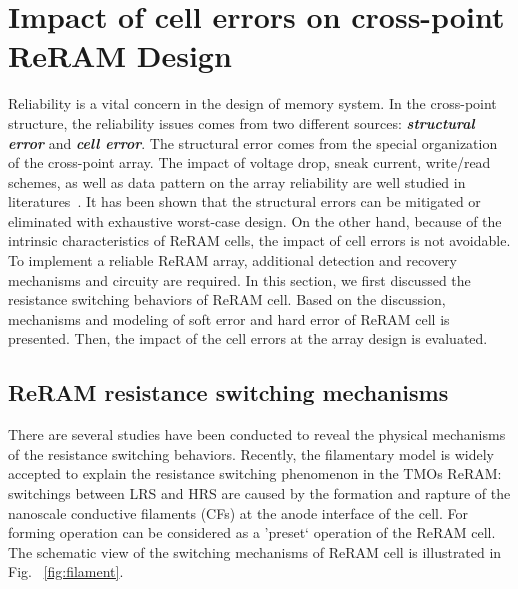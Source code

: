 \section{Impact of cell errors on cross-point ReRAM Design}

Reliability is a vital concern in the design of memory system. In the cross-point structure, the reliability issues comes from two different sources: \emph{\textbf{structural error}} and \emph{\textbf{cell error}}. The structural error comes from the special organization of the cross-point array. The impact of voltage drop, sneak current, write/read schemes, as well as data pattern on the array reliability are well studied in literatures~\cite{jiale,Dimin_ISLPED}. It has been shown that the structural errors can be mitigated or eliminated with exhaustive worst-case design. On the other hand, because of the intrinsic characteristics of ReRAM cells, the impact of cell errors is not avoidable. To implement a reliable ReRAM array, additional detection and recovery mechanisms and circuity are required. In this section, we first discussed the resistance switching behaviors of ReRAM cell. Based on the discussion, mechanisms and modeling of soft error and hard error of ReRAM cell is presented. Then, the impact of the cell errors at the array design is evaluated.

\subsection{ReRAM resistance switching mechanisms}
There are several studies have been conducted to reveal the physical mechanisms of the resistance switching behaviors. Recently, the filamentary model is widely accepted to explain the resistance switching phenomenon in the TMOs ReRAM: switchings between LRS and HRS are caused by the formation and rapture of the nanoscale conductive filaments (CFs) at the anode interface of the cell. For forming operation can be considered as a 'preset` operation of the ReRAM cell. The schematic view of the switching mechanisms of ReRAM cell is illustrated in Fig. ~\ref{fig:filament}.

